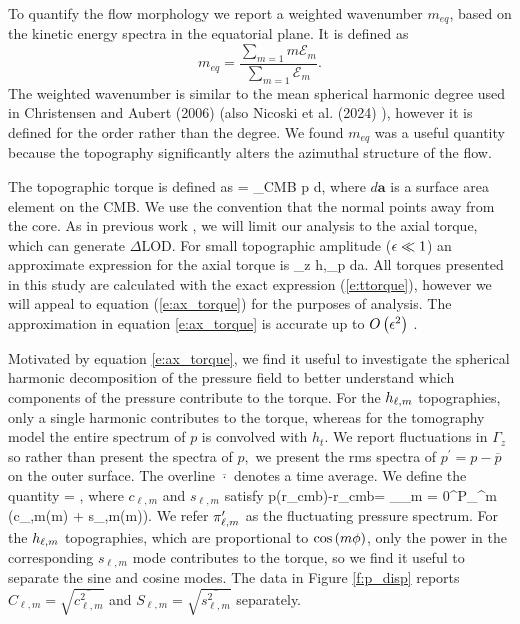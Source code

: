 To quantify the flow morphology we report a weighted wavenumber $m_{eq}$, based on the kinetic energy spectra in the equatorial plane. It is defined as 
\begin{equation}
	m_{eq} = \frac{\sum_{m=1}m \mathcal{E}_{m}}{\sum_{m=1}\mathcal{E}_{m}}.
	\label{e:meq}
\end{equation}
The weighted wavenumber is similar to the mean spherical harmonic degree used in Christensen and Aubert (2006) \citep{uC06} (also Nicoski et al. (2024) \citep{jN24}), however it is defined for the order rather than the degree.
We found $m_{eq}$ was a useful quantity because the topography significantly alters the azimuthal structure of the flow.



The topographic torque is defined as
\be
\mathbf{\Gamma} = \oint_{CMB} \times p \; d,
\label{e:ttorque}
\ee
where $d\mathbf{a}$ is a surface area element on the CMB. We use the convention that the normal points away from the core. As in previous work \citep{tO25}, we will limit our analysis to the axial torque, which can generate $\Delta$LOD. For small topographic amplitude ($\epsilon \ll 1$) an approximate expression for the axial torque is 
\be
\Gamma_z \approx \oint \epsilon h\lb\theta,\phi\rb \partial_\phi p\; da.
\label{e:ax_torque}
\ee
All torques presented in this study are calculated with the exact expression (\ref{e:ttorque}), however we will appeal to equation (\ref{e:ax_torque}) for the purposes of analysis. 
The approximation in equation \eqref{e:ax_torque} is accurate up to $O\left ( \epsilon^{2}\right )$ \citep{pR12}.

Motivated by equation \eqref{e:ax_torque}, we find it useful to investigate the spherical harmonic decomposition of the pressure field to better understand which components of the pressure contribute to the torque. For the $h_{\ell,m}$ topographies, only a single harmonic contributes to the torque, whereas for the tomography model the entire spectrum of $p$ is convolved with $h_{t}.$ 
We report fluctuations in $\Gamma_{z}$ so rather than present the spectra of $p,$ we present the rms spectra of $p^{\prime}=p-\overline{p}$ on the outer surface. The overline $\overline{\cdot}$ denotes a time average.
We define the quantity
\be \phatLM = ,
\label{e:phat}
\ee
where $c_{\ell,m}$ and $s_{\ell,m}$ satisfy
\be 
p(r_{cmb})-\lb r_{cmb}\rb = \sum_{}\sum_{m = 0}^{\ell}P_{\ell}^{m}\lb \cos\theta\rb\; (c_{\ell,m}\cos(m\phi) + s_{\ell,m}\sin(m\phi)).
\label{e:pfs}
\ee
We refer $\pi^{\prime}_{\ell,m}$ as the fluctuating pressure spectrum.
For the $h_{\ell,m}$ topographies, which are proportional to $\cos \left ( m\phi\right )$, only the power in the corresponding $s_{\ell,m}$ mode contributes to the torque, so we find it useful to separate the sine and cosine modes. The data in Figure \ref{f:p_disp} reports 
$C_{\ell,m}=\sqrt{\overline{c_{\ell,m}^{2} } }$ and
$S_{\ell,m} =\sqrt{\overline{s_{\ell,m}^{2} } }$ separately.

